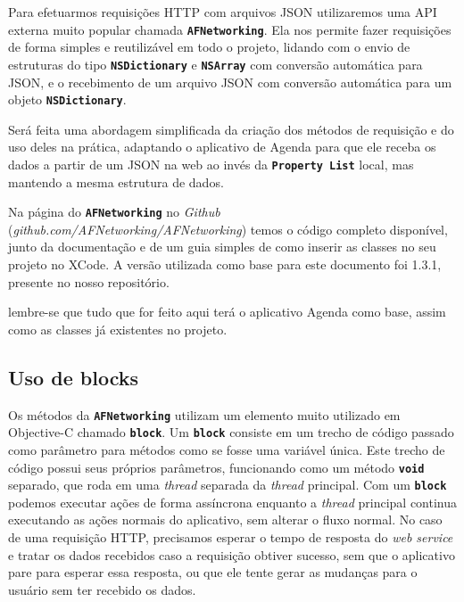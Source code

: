 \documentclass[a4paper,12pt,brazil,doubleside]{book}
\begin{document}
\begin{singlespace}
\begin{framed}
\end{framed}



Para efetuarmos requisições HTTP com arquivos JSON utilizaremos uma API externa muito popular chamada \texttt{\textbf{AFNetworking}}. Ela nos permite fazer requisições de forma simples e reutilizável em todo o projeto, lidando com o envio de estruturas do tipo \texttt{\textbf{NSDictionary}} e \texttt{\textbf{NSArray}} com conversão automática para JSON, e o recebimento de um arquivo JSON com conversão automática para um objeto \texttt{\textbf{NSDictionary}}.

Será feita uma abordagem simplificada da criação dos métodos de requisição e do uso deles na prática, adaptando o aplicativo de Agenda para que ele receba os dados a partir de um JSON na web ao invés da \texttt{\textbf{Property List}} local, mas mantendo a mesma estrutura de dados.

Na página do \texttt{\textbf{AFNetworking}} no \emph{Github} (\textit{github.com/AFNetworking/AFNetworking}) temos o código completo disponível, junto da documentação e de um guia simples de como inserir as classes no seu projeto no XCode. A versão utilizada como base para este documento foi 1.3.1, presente no nosso repositório.

lembre-se que tudo que for feito aqui terá o aplicativo Agenda como base, assim como as classes já existentes no projeto.

\bigskip

\subsection{Uso de blocks}


Os métodos da \texttt{\textbf{AFNetworking}} utilizam um elemento muito utilizado em Objective-C chamado \texttt{\textbf{block}}. Um \texttt{\textbf{block}} consiste em um trecho de código passado como parâmetro para métodos como se fosse uma variável única. Este trecho de código possui seus próprios parâmetros, funcionando como um método \texttt{\textbf{void}} separado, que roda em uma \emph{thread} separada da \emph{thread} principal. Com um \texttt{\textbf{block}} podemos executar ações de forma assíncrona enquanto a \emph{thread} principal continua executando as ações normais do aplicativo, sem alterar o fluxo normal. No caso de uma requisição HTTP, precisamos esperar o tempo de resposta do \emph{web service} e tratar os dados recebidos caso a requisição obtiver sucesso, sem que o aplicativo pare para esperar essa resposta, ou que ele tente gerar as mudanças para o usuário sem ter recebido os dados.


\end{singlespace}
\end{document}
